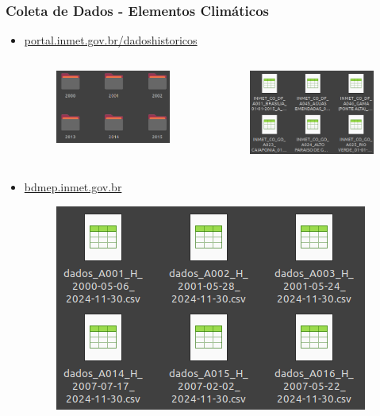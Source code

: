 \documentclass{beamer}
\begin{document}
\begin{frame}
\frametitle{Coleta de Dados - Elementos Climáticos}
\begin{itemize}
    \item \href{https://portal.inmet.gov.br/dadoshistoricos}{portal.inmet.gov.br/dadoshistoricos}
    \begin{columns}
        \begin{figure}
            \centering
            \includegraphics[width=0.7\linewidth]{pastas-inmet.png}
        \end{figure}
    

        \begin{figure}
            \centering
            \includegraphics[width=0.7\linewidth]{estacoes-inmet.png}
        \end{figure}
    \end{columns}
    \item \href{https://bdmep.inmet.gov.br}{bdmep.inmet.gov.br}
    \begin{figure}
        \centering
        \includegraphics[width=0.4\linewidth]{estacoes-bdmep.png}
    \end{figure}
\end{itemize}
\end{frame}
\end{document}
